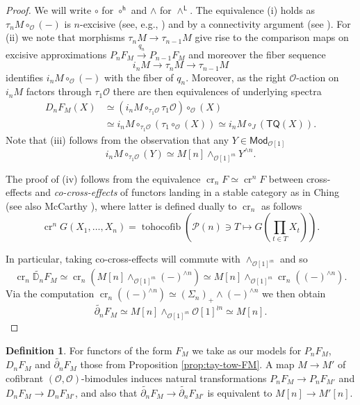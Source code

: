 \documentclass[11pt]{amsart}
\theoremstyle{definition}
\newtheorem{definition}[subsection]{Definition}
\theoremstyle{remark}
\newcommand{\TQ}{\mathsf{TQ}}
\newcommand{\cro}{\operatorname{cr}}
\newcommand{\tohocofib}{\operatorname{tohocofib}}
\newcommand{\Cal}[1]{\mathcal{#1}}
\begin{document}
\begin{proof}
We will write $\circ$ for $\circ^{\mathsf{h}}$ and $\wedge$ for $\wedge^{\mathsf{L}}$. The equivalence (i) holds as $\tau_n M\circ_{\Cal{O}}(-)$ is $n$-excisive (see, e.g.,  \cite[4.3]{Per-thesis}) and by a connectivity argument (see \cite[1.14]{Har-Hess}). For (ii) we note that morphisms $\tau_n M \to \tau_{n-1} M$ give rise to the comparison maps on excisive approximations $P_n F_M\xrightarrow{q_n} P_{n-1} F_M$ and moreover the fiber sequence \[ i_n M \to \tau_n M\to \tau_{n-1} M\] identifies $i_n M\circ_{\Cal{O}} (-)$ with the fiber of $q_n$. Moreover, as the right $\Cal{O}$-action on $i_n M$ factors through $\tau_1\Cal{O}$ there are then equivalences of underlying spectra
\begin{align*} 
    D_n F_M(X) &\simeq (i_n M\circ_{\tau_1 \Cal{O}} \tau_1\Cal{O}) \circ_{\Cal{O}}(X) \\
               &\simeq i_n M  \circ_{\tau_1\Cal{O}} (\tau_1 \circ_{\Cal{O}}(X)) 
               \simeq i_n M \circ_J (\TQ(X)).
    \end{align*} Note that (iii) follows from the observation that any $Y\in \mathsf{Mod}_{\Cal{O}[1]}$ \[ 
        i_n M \circ_{\tau_1{\Cal{O}}} (Y)\simeq M[n] \wedge_{\Cal{O}[1]^{\wr n}} Y^{\wedge n}. \] 
    
The proof of (iv) follows from the equivalence $\cro_n F\simeq\cro^nF$ between cross-effects and \textit{co-cross-effects} of functors landing in a stable category as in Ching \cite{Ching-chain-rule} (see also McCarthy \cite{McC-dual}), where latter is defined dually to $\cro_n$ as follows \[\cro^n G(X_1,\dots,X_n)=\tohocofib\left(\Cal{P}(n)\ni T\mapsto G\left( \prod_{t\in T} X_t\right) \right).\]

In particular, taking co-cross-effects will commute with $\wedge_{\Cal{O}[1]^{\wr n}}$ and so 
    \[ \cro_n \widetilde{\mathbb{D}_n} F_M \simeq \cro_n (M[n]\wedge_{\Cal{O}[1]^{\wr n}} (-)^{\wedge n})\simeq  M[n]  \wedge_{\Cal{O}[1]^{\wr n}} \cro_n ((-)^{\wedge n}).\] 
Via the computation $\cro_n ((-)^{\wedge n})\simeq (\Sigma_n)_+ \wedge (-)^{\wedge n}$ we then obtain \[\widetilde{\partial_n}F_M \simeq M[n]\wedge_{\Cal{O}[1]^{\wr n}} \Cal{O}[1]^{\wr n}\simeq M[n].\]
\end{proof}

\begin{definition}
    For functors of the form $F_M$ we take as our models for $P_n F_M$, $D_n F_M$ and $\widetilde{\partial_n} F_M$ those from Proposition \ref{prop:tay-tow-FM}. A map $M\to M'$ of cofibrant $(\Cal{O}, \Cal{O})$-bimodules induces natural transformations $P_n F_M \to P_n F_{M'}$ and $D_n F_M\to D_n F_{M'}$, and also that $\widetilde{\partial_n} F_M \to \widetilde{\partial_n} F_{M'}$ is equivalent to $M[n]\to M'[n]$.
\end{definition}
\end{document}
